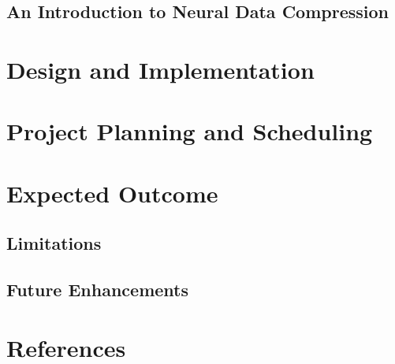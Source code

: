 \documentclass[a4paper,12pt]{article}
\begin{document}
\subsection{An Introduction to Neural Data Compression}
\newpage

\section{Design and Implementation}
\newpage

\section{Project Planning and Scheduling}
\newpage

\section{Expected Outcome}
\subsection{Limitations}
\subsection{Future Enhancements}
\newpage

\section*{References}
\newpage
\end{document}
